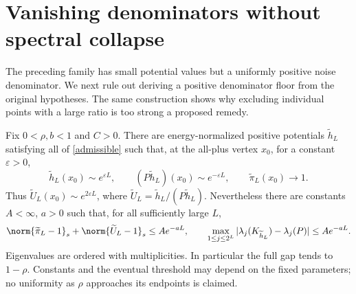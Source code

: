 \section{Vanishing denominators without spectral collapse}\label{vanishingdenominator}
The preceding family has small potential values but a uniformly positive
noise denominator. We next rule out deriving a positive denominator floor
from the original hypotheses. The same construction shows why excluding
individual points with a large ratio is too strong a proposed remedy.

\begin{theorem}\label{vanishingdenominatortheorem}
Fix $0<\rho,b<1$ and $C>0$. There are energy-normalized positive
potentials $\widetilde h_L$ satisfying all of \eqref{admissible} such that,
at the all-plus vertex $x_0$, for a constant $\varepsilon>0$,
\[
 \widetilde h_L(x_0)\sim e^{\varepsilon L},\qquad
 (P\widetilde h_L)(x_0)\sim e^{-\varepsilon L},\qquad
 \widetilde\pi_L(x_0)\longrightarrow1.
\]
Thus $\widetilde U_L(x_0)\sim e^{2\varepsilon L}$, where
$\widetilde U_L=\widetilde h_L/(P\widetilde h_L)$. Nevertheless there
are constants $A<\infty$, $a>0$ such that, for all sufficiently large $L$,
\[
 \norm{\widetilde\pi_L-1}_s+\norm{\widetilde U_L-1}_s
       \leq Ae^{-aL},\qquad
 \max_{1\leq j\leq2^L}
 |\lambda_j(K_{\widetilde h_L})-\lambda_j(P)|\leq Ae^{-aL}.
\]
Eigenvalues are ordered with multiplicities. In particular the full gap
tends to $1-\rho$. Constants and the eventual threshold may depend on
the fixed parameters; no uniformity as $\rho$ approaches its endpoints
is claimed.
\end{theorem}
